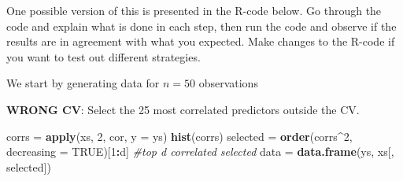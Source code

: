 \documentclass[]{article}
\newenvironment{Shaded}{\begin{snugshade}}{\end{snugshade}}
\newcommand{\CommentTok}[1]{\textcolor[rgb]{0.56,0.35,0.01}{\textit{#1}}}
\newcommand{\DataTypeTok}[1]{\textcolor[rgb]{0.13,0.29,0.53}{#1}}
\newcommand{\DecValTok}[1]{\textcolor[rgb]{0.00,0.00,0.81}{#1}}
\newcommand{\KeywordTok}[1]{\textcolor[rgb]{0.13,0.29,0.53}{\textbf{#1}}}
\newcommand{\NormalTok}[1]{#1}
\newcommand{\OperatorTok}[1]{\textcolor[rgb]{0.81,0.36,0.00}{\textbf{#1}}}
\newcommand{\OtherTok}[1]{\textcolor[rgb]{0.56,0.35,0.01}{#1}}
\newcommand{\StringTok}[1]{\textcolor[rgb]{0.31,0.60,0.02}{#1}}
\begin{document}
One possible version of this is presented in the R-code below. Go
through the code and explain what is done in each step, then run the
code and observe if the results are in agreement with what you expected.
Make changes to the R-code if you want to test out different strategies.

We start by generating data for \(n=50\) observations

\begin{Shaded}
\end{Shaded}

\textbf{WRONG CV}: Select the 25 most correlated predictors outside the
CV.

\begin{Shaded}
\begin{Highlighting}[]
\NormalTok{corrs =}\StringTok{ }\KeywordTok{apply}\NormalTok{(xs, }\DecValTok{2}\NormalTok{, cor, }\DataTypeTok{y =}\NormalTok{ ys)}
\KeywordTok{hist}\NormalTok{(corrs)}
\NormalTok{selected =}\StringTok{ }\KeywordTok{order}\NormalTok{(corrs}\OperatorTok{^}\DecValTok{2}\NormalTok{, }\DataTypeTok{decreasing =} \OtherTok{TRUE}\NormalTok{)[}\DecValTok{1}\OperatorTok{:}\NormalTok{d]  }\CommentTok{#top d correlated selected}
\NormalTok{data =}\StringTok{ }\KeywordTok{data.frame}\NormalTok{(ys, xs[, selected])}
\end{Highlighting}
\end{Shaded}
\end{document}

